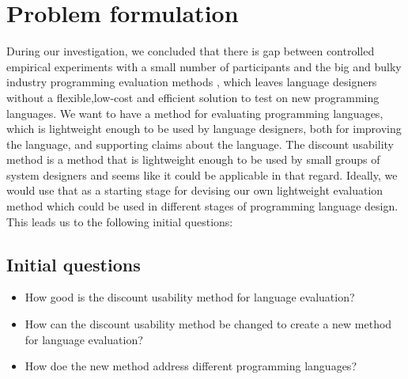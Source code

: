 \section{Problem formulation}
During our investigation, we concluded that there is gap between  controlled empirical experiments with a small number of participants and the big and bulky industry programming evaluation methods , which leaves language designers without a flexible,low-cost and efficient solution to test on new programming languages. We want to have a method for evaluating programming languages, which is lightweight enough to be used by language designers, both for improving the language, and supporting claims about the language. The discount usability method is a method that is lightweight enough to be used by small groups of system designers and seems like it could be applicable in that regard. Ideally, we would use that as a starting stage for devising our own lightweight evaluation method which could be used in different stages of programming language design. This leads us to the following initial questions:

\subsection{Initial questions}
\begin{itemize}
\item How good is the discount usability method for language evaluation?
\item How can the discount usability method be changed to create a new method for language evaluation?
\item How doe the new method address different programming languages?
\end{itemize}
